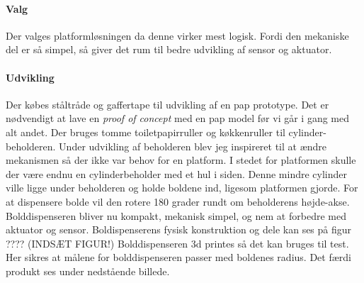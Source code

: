 \documentclass[Rapport/Rapport_main.tex]{subfiles}
\begin{document}
\paragraph{Valg}
\newline\newline
Der valges platformløsningen da denne virker mest logisk. Fordi den mekaniske del er så simpel, så giver det rum til bedre udvikling af sensor og aktuator.

\paragraph{Udvikling}
\newline\newline
Der købes ståltråde og gaffertape til udvikling af en pap prototype. Det er nødvendigt at lave en \textit{proof of concept} med en pap model før vi går i gang med alt andet. Der bruges tomme toiletpapirruller og køkkenruller til cylinder-beholderen. Under udvikling af beholderen blev jeg inspireret til at ændre mekanismen så der ikke var behov for en platform. I stedet for platformen skulle der være endnu en cylinderbeholder med et hul i siden. Denne mindre cylinder ville ligge under beholderen og holde boldene ind, ligesom platformen gjorde. For at dispensere bolde vil den rotere 180 grader rundt om beholderens højde-akse. Bolddispenseren bliver nu kompakt, mekanisk simpel, og nem at forbedre med aktuator og sensor. Boldispenserens fysisk konstruktion og dele kan ses på figur ????
(INDSÆT FIGUR!)
Bolddispenseren 3d printes så det kan bruges til test. Her sikres at målene for bolddispenseren passer med boldenes radius. Det færdi produkt ses under nedstående billede.


\end{document}
